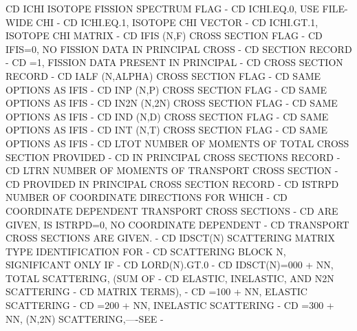 \begin{ccode}
CD    ICHI          ISOTOPE FISSION SPECTRUM FLAG                      -
CD                      ICHI.EQ.0,     USE FILE-WIDE CHI               -
CD                      ICHI.EQ.1,     ISOTOPE CHI VECTOR              -
CD                      ICHI.GT.1,     ISOTOPE CHI MATRIX              -
CD    IFIS          (N,F) CROSS SECTION FLAG                           -
CD                     IFIS=0, NO FISSION DATA IN PRINCIPAL CROSS      -
CD                                       SECTION RECORD                -
CD                         =1, FISSION DATA PRESENT IN PRINCIPAL       -
CD                                       CROSS SECTION RECORD          -
CD    IALF          (N,ALPHA) CROSS SECTION FLAG                       -
CD                     SAME OPTIONS AS IFIS                            -
CD    INP           (N,P) CROSS SECTION FLAG                           -
CD                     SAME OPTIONS AS IFIS                            -
CD    IN2N          (N,2N) CROSS SECTION FLAG                          -
CD                     SAME OPTIONS AS IFIS                            -
CD    IND           (N,D) CROSS SECTION FLAG                           -
CD                     SAME OPTIONS AS IFIS                            -
CD    INT           (N,T) CROSS SECTION FLAG                           -
CD                     SAME OPTIONS AS IFIS                            -
CD    LTOT          NUMBER OF MOMENTS OF TOTAL CROSS SECTION PROVIDED  -
CD                     IN PRINCIPAL CROSS SECTIONS RECORD              -
CD    LTRN          NUMBER OF MOMENTS OF TRANSPORT CROSS SECTION       -
CD                     PROVIDED IN PRINCIPAL CROSS SECTION RECORD      -
CD    ISTRPD        NUMBER OF COORDINATE DIRECTIONS FOR WHICH          -
CD                     COORDINATE DEPENDENT TRANSPORT CROSS SECTIONS   -
CD                     ARE GIVEN, IS ISTRPD=0, NO COORDINATE DEPENDENT -
CD                     TRANSPORT CROSS SECTIONS ARE GIVEN.             -
CD    IDSCT(N)      SCATTERING MATRIX TYPE IDENTIFICATION FOR          -
CD                     SCATTERING BLOCK N, SIGNIFICANT ONLY IF         -
CD                     LORD(N).GT.0                                    -
CD                     IDSCT(N)=000 + NN, TOTAL SCATTERING, (SUM OF    -
CD                         ELASTIC, INELASTIC, AND N2N SCATTERING      -
CD                         MATRIX TERMS),                              -
CD                             =100 + NN, ELASTIC SCATTERING           -
CD                             =200 + NN, INELASTIC SCATTERING         -
CD                             =300 + NN, (N,2N) SCATTERING,----SEE    -

\end{ccode}
